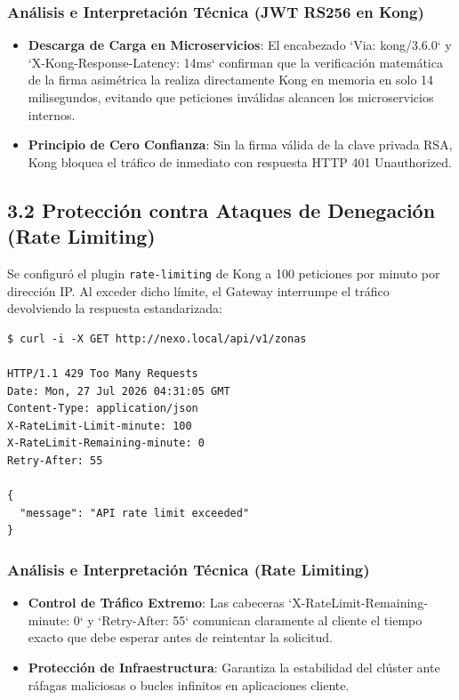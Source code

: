 \documentclass[11pt,a4paper]{article}
\begin{document}
\subsubsection{Análisis e Interpretación Técnica (JWT RS256 en Kong)}
\begin{itemize}[leftmargin=*]
    \item \textbf{Descarga de Carga en Microservicios}: El encabezado `Via: kong/3.6.0` y `X-Kong-Response-Latency: 14ms` confirman que la verificación matemática de la firma asimétrica la realiza directamente Kong en memoria en solo 14 milisegundos, evitando que peticiones inválidas alcancen los microservicios internos.
    \item \textbf{Principio de Cero Confianza}: Sin la firma válida de la clave privada RSA, Kong bloquea el tráfico de inmediato con respuesta HTTP 401 Unauthorized.
\end{itemize}

\subsection{3.2 Protección contra Ataques de Denegación (Rate Limiting)}
Se configuró el plugin \texttt{rate-limiting} de Kong a 100 peticiones por minuto por dirección IP. Al exceder dicho límite, el Gateway interrumpe el tráfico devolviendo la respuesta estandarizada:

\begin{macdraculacode}
\begin{lstlisting}
$ curl -i -X GET http://nexo.local/api/v1/zonas

HTTP/1.1 429 Too Many Requests
Date: Mon, 27 Jul 2026 04:31:05 GMT
Content-Type: application/json
X-RateLimit-Limit-minute: 100
X-RateLimit-Remaining-minute: 0
Retry-After: 55

{
  "message": "API rate limit exceeded"
}
\end{lstlisting}
\end{macdraculacode}

\subsubsection{Análisis e Interpretación Técnica (Rate Limiting)}
\begin{itemize}[leftmargin=*]
    \item \textbf{Control de Tráfico Extremo}: Las cabeceras `X-RateLimit-Remaining-minute: 0` y `Retry-After: 55` comunican claramente al cliente el tiempo exacto que debe esperar antes de reintentar la solicitud.
    \item \textbf{Protección de Infraestructura}: Garantiza la estabilidad del clúster ante ráfagas maliciosas o bucles infinitos en aplicaciones cliente.
\end{itemize}
\end{document}
